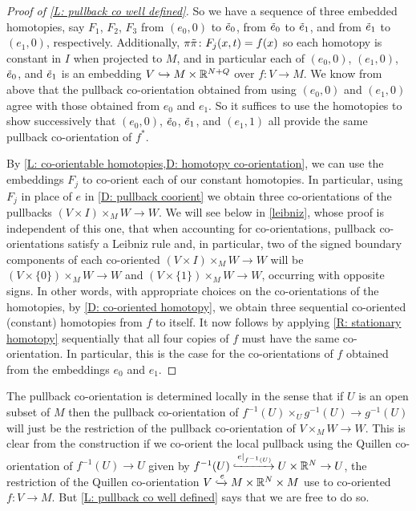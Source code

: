 \begin{proof}[Proof of \cref{L: pullback co well defined}]
	So we have a sequence of three embedded homotopies, say $F_1$, $F_2$, $F_3$ from $(e_0,0)$ to $\tilde e_0$, from $\tilde e_0$ to $\tilde e_1$, and from $\tilde e_1$ to $(e_1,0)$, respectively.
	Additionally, $\pi \tilde \pi \colon F_j(x,t) = f(x)$ so each homotopy is constant in $I$ when projected to $M$, and in particular each of $(e_0,0)$, $(e_1,0)$, $\tilde e_0$, and $\tilde e_1$ is an embedding $V \hookrightarrow M \times \mathbb{R}^{N+Q}$ over $f \colon V \to M$.
	We know from above that the pullback co-orientation obtained from using $(e_0,0)$ and $(e_1,0)$ agree with those obtained from $e_0$ and $e_1$.
	So it suffices to use the homotopies to show successively that $(e_0,0)$, $\tilde e_0$, $\tilde e_1$, and $(e_1,1)$ all provide the same pullback co-orientation of $f^*$.

	By \cref{L: co-orientable homotopies,D: homotopy co-orientation}, we can use the embeddings $F_j$ to co-orient each of our constant homotopies.
	In particular, using $F_j$ in place of $e$ in \cref{D: pullback coorient} we obtain three co-orientations of the pullbacks $(V \times I) \times_M W \to W$.
	We will see below in \cref{leibniz}, whose proof is independent of this one, that when accounting for co-orientations, pullback co-orientations satisfy a Leibniz rule and, in particular, two of the signed boundary components of each co-oriented $(V \times I) \times_M W \to W$ will be $(V \times \{0\}) \times_M W \to W$ and $(V \times \{1\}) \times_M W \to W$, occurring with opposite signs.
	In other words, with appropriate choices on the co-orientations of the homotopies, by \cref{D: co-oriented homotopy}, we obtain three sequential co-oriented (constant) homotopies from $f$ to itself.
	It now follows by applying \cref{R: stationary homotopy} sequentially that all four copies of $f$ must have the same co-orientation.
	In particular, this is the case for the co-orientations of $f$ obtained from the embeddings $e_0$ and $e_1$.
\end{proof}

\begin{remark}\label{R: local pullback co-orientations}
	The pullback co-orientation is determined locally in the sense that if $U$ is an open subset of $M$ then the pullback co-orientation of $f^{-1}(U) \times_U g^{-1}(U) \to g^{-1}(U)$ will just be the restriction of the pullback co-orientation of $V \times_M W \to W$.
	This is clear from the construction if we co-orient the local pullback using the Quillen co-orientation of $f^{-1}(U) \to U$ given by $f^{-1}(U) \xhookrightarrow{e|_{f^{-1}(U)}} U \times \mathbb{R}^N \to U$, the restriction of the Quillen co-orientation $V\xhookrightarrow{e}M \times \mathbb{R}^N \times M$ use to co-oriented $f \colon V \to M$.
	But \cref{L: pullback co well defined} says that we are free to do so.
\end{remark}

